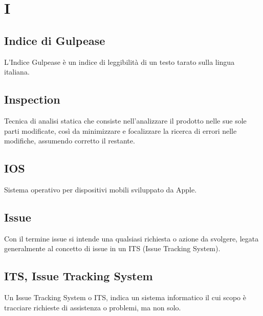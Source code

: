 \section{I}
	\subsection{Indice di Gulpease}
		L'Indice Gulpease è un indice di leggibilità di un testo tarato sulla lingua italiana.
	\subsection{Inspection} 
		Tecnica di analisi statica che consiste nell'analizzare il prodotto nelle sue sole parti modificate, così da minimizzare e focalizzare la ricerca di errori nelle modifiche, assumendo corretto il restante.
	\subsection{IOS}
	    Sistema operativo per dispositivi mobili sviluppato da Apple.
	\subsection{Issue}  
		Con il termine issue si intende una qualsiasi richiesta o azione da svolgere, legata generalmente al concetto di issue in un ITS (Issue Tracking System).
	\subsection{ITS, Issue Tracking System}  
		Un Issue Tracking System o ITS, indica un sistema informatico il cui scopo è tracciare richieste di assistenza o problemi, ma non solo.
	
\newpage